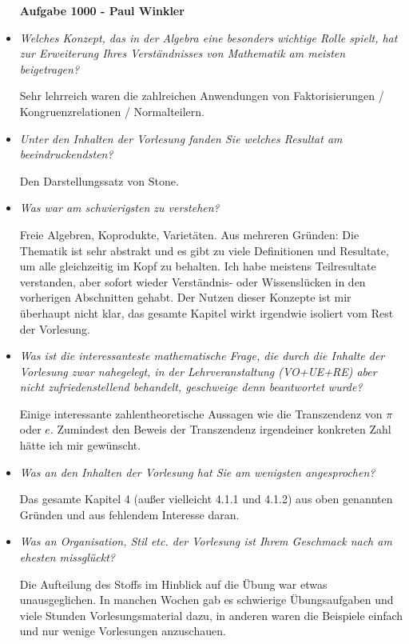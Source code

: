 \documentclass[a4paper,11pt]{article}
\begin{document}
\begin{itemize}

\begin{center}
  \textbf{Aufgabe 1000 - Paul Winkler}
\end{center}
\item
 \textit{Welches Konzept, das in der Algebra eine besonders wichtige Rolle spielt, hat zur Erweiterung Ihres Verst\"andnisses von Mathematik am meisten beigetragen?}

 Sehr lehrreich waren die zahlreichen Anwendungen von Faktorisierungen / Kongruenzrelationen / Normalteilern.
 \item
 \textit{Unter den Inhalten der Vorlesung fanden Sie welches Resultat am beeindruckendsten?}

 Den Darstellungssatz von Stone.
 \item
 \textit{Was war am schwierigsten zu verstehen?}

 Freie Algebren, Koprodukte, Variet\"aten. Aus mehreren Gr\"unden: Die Thematik ist sehr abstrakt und es gibt zu viele Definitionen und Resultate, um alle gleichzeitig im Kopf zu behalten. Ich habe meistens Teilresultate verstanden, aber sofort wieder Verst\"andnis- oder Wissensl\"ucken in den vorherigen Abschnitten gehabt. Der Nutzen dieser Konzepte ist mir \"uberhaupt nicht klar, das gesamte Kapitel wirkt irgendwie isoliert vom Rest der Vorlesung.
 \item
 \textit{Was ist die interessanteste mathematische Frage, die durch die Inhalte der Vorlesung zwar nahegelegt, in der Lehrveranstaltung (VO+UE+RE) aber nicht zufriedenstellend behandelt, geschweige denn beantwortet wurde?}

 Einige interessante zahlentheoretische Aussagen wie die Transzendenz von $\pi$ oder $e.$ Zumindest den Beweis der Transzendenz irgendeiner konkreten Zahl h\"atte ich mir gew\"unscht.

 \item
 \textit{Was an den Inhalten der Vorlesung hat Sie am wenigsten angesprochen?}

 Das gesamte Kapitel 4 (au\ss{}er vielleicht 4.1.1 und 4.1.2) aus oben genannten Gr\"unden und aus fehlendem Interesse daran.

 \item
 \textit{Was an Organisation, Stil etc. der Vorlesung ist Ihrem Geschmack nach am ehesten missgl\"uckt?}

 Die Aufteilung des Stoffs im Hinblick auf die \"Ubung war etwas unausgeglichen. In manchen Wochen gab es schwierige \"Ubungsaufgaben und viele Stunden Vorlesungsmaterial dazu, in anderen waren die Beispiele einfach und nur wenige Vorlesungen anzuschauen.


\end{itemize}
\end{document}
